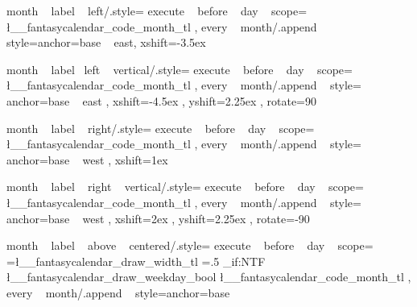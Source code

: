 %
%



\tikzset
  {
    month ~ label ~ left/.style=
      {
        execute ~ before ~ day ~ scope=
          {
             { \l__fantasycalendar_code_month_tl }
          }
        ,
        every ~ month/.append ~ style={anchor=base ~ east, xshift=-3.5ex}
      }
  }

\tikzset
  {
    month ~ label ~left ~ vertical/.style=
      {
        execute ~ before ~ day ~ scope=
          {
             { \l__fantasycalendar_code_month_tl } 
          } ,
        every ~ month/.append ~ style=
          { anchor=base ~ east , xshift=-4.5ex , yshift=2.25ex , rotate=90 }
      }
  }

\tikzset
  {
    month ~ label ~ right/.style=
      {
        execute ~ before ~ day ~ scope=
          {
              {
                {
                  \l__fantasycalendar_code_month_tl
                }
              }
          }
        ,
        every ~ month/.append ~ style={ anchor=base ~ west , xshift=1ex }
    }
  }

\tikzset
  {
    month ~ label ~ right ~ vertical/.style=
      {
        execute ~ before ~ day ~ scope=
          {
              {
                {
                  \l__fantasycalendar_code_month_tl%
                }
              }
          }
        ,
        every ~ month/.append ~ style=
          { anchor=base ~ west , xshift=2ex , yshift=2.25ex , rotate=-90 }
    }
  }




\tikzset
  {
    month ~ label ~ above ~ centered/.style=
      {
        execute ~ before ~ day ~ scope=
          {
              {
                {
                  \pgf@xb=\l__fantasycalendar_draw_width_tl\pgf@xa%
                  \pgf@xb=.5\pgf@xb%
                  \pgftransformxshift{\pgf@xb}
                  \bool_if:NTF \l__fantasycalendar_draw_weekday_bool
                    {  }
                    {  }
                  \l__fantasycalendar_code_month_tl
                }
              } 
          }
        ,
  every ~ month/.append ~ style={anchor=base}
}}


